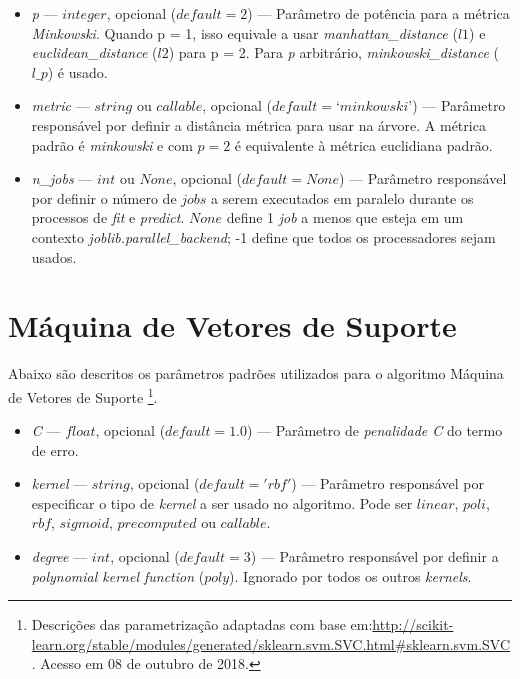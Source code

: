 \documentclass[
	12pt,				%
	oneside,			%
	a4paper,			%
	english,			%
	brazil				%
	]{abntex2ppgsi}
\begin{document}
{{{\begin{apendicesenv}
\begin{itemize}
\item \textit{p} --- $integer$, opcional ($default = 2$) --- Parâmetro de potência para a métrica \textit{Minkowski}. Quando p = 1, isso equivale a usar \textit{manhattan\_distance} ($l1$) e \textit{euclidean\_distance} ($l2$) para p = 2. Para \textit{p} arbitrário, \textit{minkowski\_distance} ($l\_p$) é usado.

\item \textit{metric} --- $string$ ou $callable$, opcional ($default = ‘minkowski’$) --- Parâmetro responsável por definir a distância métrica para usar na árvore. A métrica padrão é \textit{minkowski} e com $p = 2$ é equivalente à métrica euclidiana padrão. 

\item \textit{n\_jobs} --- $int$ ou $None$, opcional ($default = None$) --- Parâmetro responsável por definir o número de $jobs$ a serem executados em paralelo durante os processos de \textit{fit} e \textit{predict}. $None$ define 1 \textit{job} a menos que esteja em um contexto \textit{joblib.parallel\_backend}; -1 define que todos os processadores sejam usados.
\end{itemize}

\section{Máquina de Vetores de Suporte}

Abaixo são descritos os parâmetros padrões utilizados para o algoritmo Máquina de Vetores de Suporte
\footnote{Descrições das parametrização adaptadas com base em:\url{http://scikit-learn.org/stable/modules/generated/sklearn.svm.SVC.html\#sklearn.svm.SVC}. Acesso em 08 de outubro de 2018.}.

\begin{itemize}
\item \textit{C} --- $float$, opcional ($default=1.0$)
 --- Parâmetro de \textit{penalidade C} do termo de erro.
 
 \item \textit{kernel} --- $string$, opcional ($default='rbf'$) --- Parâmetro responsável por especificar o tipo de \textit{kernel} a ser usado no algoritmo. Pode ser $linear$, $poli$, $rbf$, $sigmoid$, $precomputed$ ou $callable$.

\item \textit{degree} --- $int$, opcional ($default=3$) --- Parâmetro responsável por definir a \textit{polynomial kernel function} ($poly$). Ignorado por todos os 
outros \textit{kernels}.


\end{itemize}
\end{apendicesenv}}}}
\end{document}
